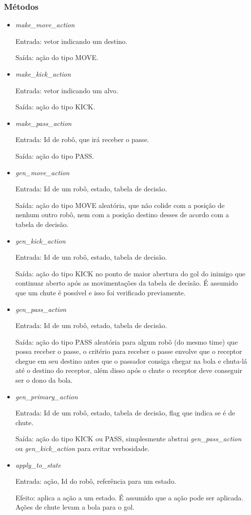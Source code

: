 \subsubsection*{Métodos}

\begin{itemize}
  \item \textit{make_move_action}
    \par Entrada: vetor indicando um destino.
    \par Saída: ação do tipo MOVE.
  \item \textit{make_kick_action}
    \par Entrada: vetor indicando um alvo.
    \par Saída: ação do tipo KICK.
  \item \textit{make_pass_action}
    \par Entrada: Id de robô, que irá receber o passe.
    \par Saída: ação do tipo PASS.
  \item \textit{gen_move_action}
    \par Entrada: Id de um robô, estado, tabela de decisão.
    \par Saída: ação do tipo MOVE aleatória, que não colide com a posição de
    nenhum outro robô, nem com a posição destino desses de acordo com a tabela
    de decisão.
  \item \textit{gen_kick_action}
    \par Entrada: Id de um robô, estado, tabela de decisão.
    \par Saída: ação do tipo KICK no ponto de maior abertura do gol do inimigo
    que continuar aberto após as movimentações da tabela de decisão.  É assumido
    que um chute é possível e isso foi verificado previamente.
  \item \textit{gen_pass_action}
    \par Entrada: Id de um robô, estado, tabela de decisão.
    \par Saída: ação do tipo PASS aleatória para algum robô (do mesmo time) que
    possa receber o passe, o critério para receber o passe envolve que o
    receptor chegue em seu destino antes que o passador consiga chegar na bola e
    chuta-lá até o destino do receptor, além disso após o chute o receptor deve
    conseguir ser o dono da bola.
  \item \textit{gen_primary_action}
    \par Entrada: Id de um robô, estado, tabela de decisão, flag que indica se é
    de chute.
    \par Saída: ação do tipo KICK ou PASS, simplesmente abstrai
    \textit{gen_pass_action} ou \textit{gen_kick_action} para evitar verbosidade.
  \item \textit{apply_to_state}
    \par Entrada: ação, Id do robô, referência para um estado.
    \par Efeito: aplica a ação a um estado.  É assumido que a ação pode ser
    aplicada.  Ações de chute levam a bola para o gol.
\end{itemize}

